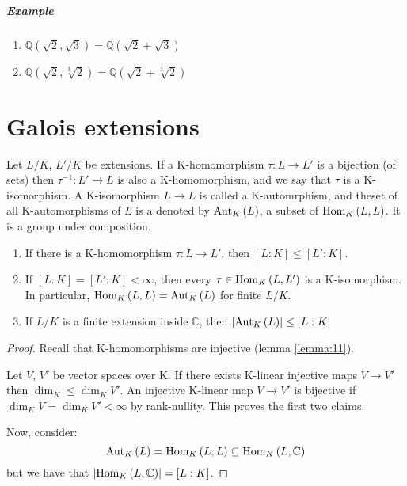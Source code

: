 \subparagraph{Example}

\begin{enumerate}
\item $\mathbb{Q}(\sqrt{2}, \sqrt{3}) = \mathbb{Q}(\sqrt{2} + \sqrt{3})$
\item $\mathbb{Q}(\sqrt{2}, \sqrt[3]{2}) = \mathbb{Q}(\sqrt{2} + \sqrt[3]{2})$
\end{enumerate}

\section{Galois extensions}

\begin{definition}\label{def:21}
  Let $L/K$, $L'/K$ be extensions. If a K-homomorphism $\tau : L \rightarrow L'$ is a bijection (of sets) then $\tau^{-1} : L' \rightarrow L$ is also a K-homomorphism, and we say that $\tau$ is a K-isomorphism. A K-isomorphism $L \rightarrow L$ is called a K-automrphism, and theset of all K-automorphisms of $L$ is a denoted by $\text{Aut}_{K}\left(L\right)$, a subset of $\text{Hom}_{K}\left(L, L\right)$. It is a group under composition.
\end{definition}

\begin{lemma}
  \label{lemma:22}
  \begin{enumerate}
  \item If there is a K-homomorphism $\tau : L \rightarrow L'$, then $[L : K] \leq [L' : K]$.
  \item If $[L : K] = [L' : K] < \infty$, then every $\tau \in \text{Hom}_{K}\left(L, L'\right)$ is a K-isomorphism. In particular, $\text{Hom}_{K}\left(L, L\right) = \text{Aut}_{K}\left(L\right)$ for finite $L/K$.
  \item If $L/K$ is a finite extension inside $\mathbb{C}$, then $\left|\text{Aut}_{K}\left(L\right)\right| \leq [L : K]$
  \end{enumerate}
\end{lemma}

\begin{proof}
  Recall that K-homomorphisms are injective (lemma \eqref{lemma:11}). 

  Let $V$, $V'$ be vector spaces over K. If there exists K-linear injective maps $V \rightarrow V'$ then $\dim_K \leq \dim_K V'$. An injective K-linear map $V \rightarrow V'$ is bijective if $\dim_K V = \dim_K V' < \infty$ by rank-nullity. This proves the first two claims.

Now, consider:
\begin{equation*}
  \text{Aut}_{K}\left(L\right) = \text{Hom}_{K}\left(L, L\right) \subseteq \text{Hom}_{K}\left(L, \mathbb{C}\right)
\end{equation*}
but we have that $\left|\text{Hom}_{K}\left(L, \mathbb{C}\right)\right| = [L : K]$.
\end{proof}

